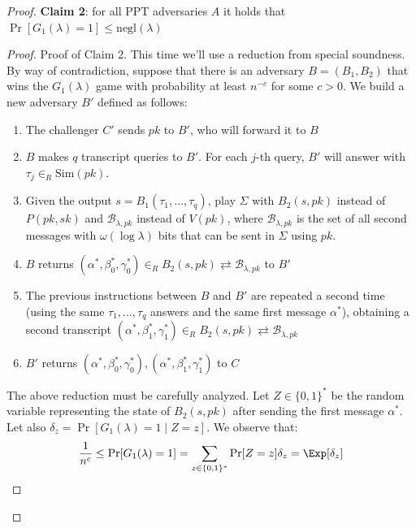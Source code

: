 \documentclass[a4paper, 12pt]{report}
\begin{document}
\begin{proof}
        \textbf{Claim 2}: for all PPT adversaries $A$ it holds that $\Pr[G_1(\lambda) = 1] \leq \mathrm{negl}(\lambda)$

        \begin{proof}{Proof of Claim 2.}
            This time we'll use a reduction from special soundness. By way of contradiction, suppose that there is an adversary $B = (B_1, B_2)$ that wins the $G_1(\lambda)$ game with probability at least $n^{-c}$ for some $c > 0$. We build a new adversary $B'$ defined as follows:
            \begin{enumerate}
                \item The challenger $C'$ sends $pk$ to $B'$, who will forward it to $B$
                \item $B$ makes $q$ transcript queries to $B'$. For each $j$-th query, $B'$ will answer with $\tau_j \in_R \mathrm{Sim}(pk)$. 
                \item Given the output $s = B_1(\tau_1, \ldots, \tau_q)$, play $\Sigma$ with $B_2(s,pk)$ instead of $P(pk,sk)$ and $\mathcal{B}_{\lambda, pk}$ instead of $V(pk)$, where $\mathcal{B}_{\lambda, pk}$ is the set of all second messages with $\omega(\log \lambda)$ bits that can be sent in $\Sigma$ using $pk$.
                \item $B$ returns $(\alpha^*, \beta_0^*, \gamma_0^*) \in_R B_2(s, pk) \rightleftarrows \mathcal{B}_{\lambda, pk}$ to $B'$
                \item The previous instructions between $B$ and $B'$ are repeated a second time (using the same $\tau_1, \ldots, \tau_q$ answers and the same first message $\alpha^*$), obtaining a second transcript $(\alpha^*, \beta_1^*, \gamma_1^*) \in_R B_2(s, pk) \rightleftarrows \mathcal{B}_{\lambda, pk}$
                \item $B'$ returns $(\alpha^*, \beta_0^*, \gamma_0^*), (\alpha^*, \beta_1^*, \gamma_1^*)$ to $C$
            \end{enumerate}

            The above reduction must be carefully analyzed. Let $Z \in \{0,1\}^*$ be the random variable representing the state of $B_2(s, pk)$ after sending the first message $\alpha^*$. Let also $\delta_z = \Pr[G_1(\lambda) = 1 \mid Z = z]$. We observe that:
            \[\frac{1}{n^c} \leq \Pr[G_1(\lambda) = 1] = \sum_{z \in \{0,1\}^*} \Pr[Z = z] \delta_z = \Exp[\delta_z]\]


\end{proof}
\end{proof}
\end{document}
